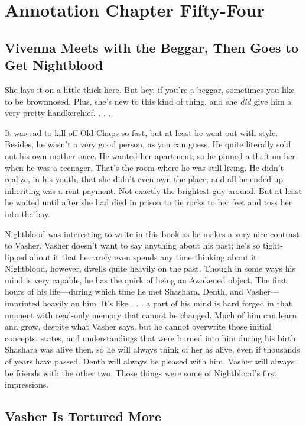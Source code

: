 \section{Annotation Chapter Fifty-Four}

\subsection*{Vivenna Meets with the Beggar, Then Goes to Get Nightblood}

She lays it on a little thick here. But hey, if you’re a beggar, sometimes you like to be brownnosed. Plus, she’s new to this kind of thing, and she \textit{did} give him a very pretty handkerchief. . . .

It was sad to kill off Old Chaps so fast, but at least he went out with style. Besides, he wasn’t a very good person, as you can guess. He quite literally sold out his own mother once. He wanted her apartment, so he pinned a theft on her when he was a teenager. That’s the room where he was still living. He didn’t realize, in his youth, that she didn’t even own the place, and all he ended up inheriting was a rent payment. Not exactly the brightest guy around. But at least he waited until after she had died in prison to tie rocks to her feet and toss her into the bay.

Nightblood was interesting to write in this book as he makes a very nice contrast to Vasher. Vasher doesn’t want to say anything about his past; he’s so tight-lipped about it that he rarely even spends any time thinking about it. Nightblood, however, dwells quite heavily on the past. Though in some ways his mind is very capable, he has the quirk of being an Awakened object. The first hours of his life—during which time he met Shashara, Denth, and Vasher—imprinted heavily on him. It’s like . . . a part of his mind is hard forged in that moment with read-only memory that cannot be changed. Much of him can learn and grow, despite what Vasher says, but he cannot overwrite those initial concepts, states, and understandings that were burned into him during his birth. Shashara was alive then, so he will always think of her as alive, even if thousands of years have passed. Denth will always be pleased with him. Vasher will always be friends with the other two. Those things were some of Nightblood’s first impressions.

\subsection*{Vasher Is Tortured More}

